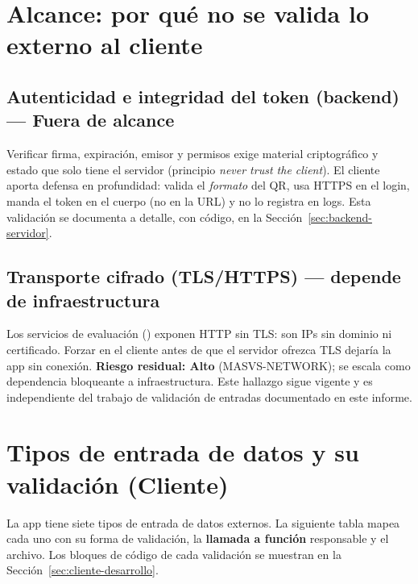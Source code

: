 \documentclass[11pt,a4paper]{article}
\newcommand{\Fuera}{\textcolor{fueraColor}{Fuera de alcance}}
\begin{document}
\section{Alcance: por qué no se valida lo externo al cliente}

\subsection{Autenticidad e integridad del token (backend) --- \Fuera}
\label{ssec:alcance-token}

Verificar firma, expiración, emisor y permisos exige material criptográfico y estado que solo tiene el servidor (principio \emph{never trust the client}). El cliente aporta defensa en profundidad: valida el \emph{formato} del QR, usa HTTPS en el login, manda el token en el cuerpo (no en la URL) y no lo registra en logs. Esta validación se documenta a detalle, con código, en la Sección~\ref{sec:backend-servidor}.

\subsection{Transporte cifrado (TLS/HTTPS) --- depende de infraestructura}

Los servicios de evaluación (\texttt{}) exponen HTTP sin TLS: son IPs sin dominio ni certificado. Forzar \texttt{} en el cliente antes de que el servidor ofrezca TLS dejaría la app sin conexión. \textbf{Riesgo residual: Alto} (MASVS-NETWORK); se escala como dependencia bloqueante a infraestructura. Este hallazgo sigue vigente y es independiente del trabajo de validación de entradas documentado en este informe.

\section{Tipos de entrada de datos y su validación (Cliente)}

La app tiene siete tipos de entrada de datos externos. La siguiente tabla mapea cada uno con su forma de validación, la \textbf{llamada a función} responsable y el archivo. Los bloques de código de cada validación se muestran en la Sección~\ref{sec:cliente-desarrollo}.
\end{document}
